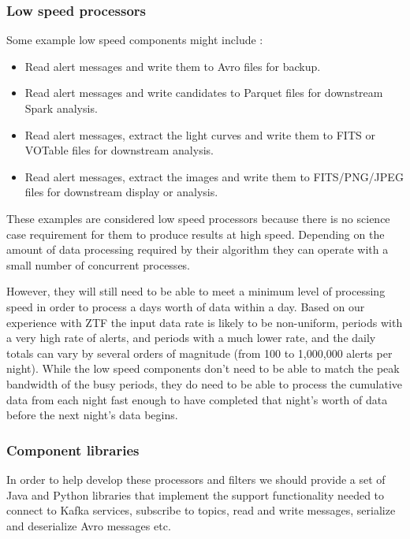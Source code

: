 \documentclass{article}
\newcommand{\avro} {Avro\xspace}
\newcommand{\fits} {FITS\xspace}
\newcommand{\parquet} {Parquet\xspace}
\newcommand{\votable} {VOTable\xspace}
\newcommand{\kafka} {Kafka\xspace}
\newcommand{\spark} {Spark\xspace}
\newcommand{\ztf} {ZTF\xspace}
\begin{document}
\subsubsection{Low speed processors}
\label{stage-2.low-speed.processors}

Some example low speed components might include :
\begin{itemize}
  \item Read alert messages and write them to \avro files for backup.
  \item Read alert messages and write candidates to \parquet files for downstream \spark analysis.
  \item Read alert messages, extract the light curves and write them to \fits or \votable files for downstream analysis.
  \item Read alert messages, extract the images and write them to FITS/PNG/JPEG files for downstream display or analysis.
\end{itemize}

These examples are considered low speed processors because there is no science case requirement for them to produce results at high speed. Depending on the amount of data processing required by their algorithm they can operate with a small number of concurrent processes.

However, they will still need to be able to meet a minimum level of processing speed in order to process a days worth of data within a day. Based on our experience with \ztf the input data rate is likely to be non-uniform, periods with a very high rate of alerts, and periods with a much lower rate, and the daily totals can vary by several orders of magnitude (from 100 to 1,000,000 alerts per night).
While the low speed components don't need to be able to match the peak bandwidth of the busy periods, they do need to be able to process the cumulative data from each night fast enough to have completed that night's worth of data before the next night's data begins.

\subsubsection{Component libraries}
\label{stage-2.component-libraries}

In order to help develop these processors and filters we should provide a set of Java and Python libraries that implement the support functionality needed to connect to \kafka services, subscribe to topics, read and write messages, serialize and deserialize \avro messages etc.
\end{document}
